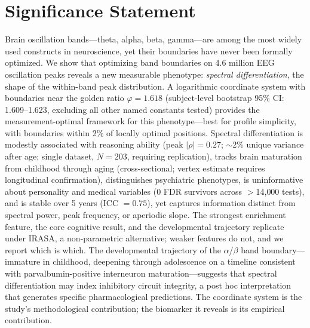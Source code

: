 \documentclass[11pt,a4paper]{article}
\newcommand{\phisym}{\varphi}
\begin{document}
\section*{Significance Statement}
Brain oscillation bands---theta, alpha, beta, gamma---are among the most widely used constructs in neuroscience, yet their boundaries have never been formally optimized. We show that optimizing band boundaries on 4.6 million EEG oscillation peaks reveals a new measurable phenotype: \emph{spectral differentiation}, the shape of the within-band peak distribution. A logarithmic coordinate system with boundaries near the golden ratio $\phisym = 1.618$ (subject-level bootstrap 95\% CI: 1.609--1.623, excluding all other named constants tested) provides the measurement-optimal framework for this phenotype---best for profile simplicity, with boundaries within 2\% of locally optimal positions. Spectral differentiation is modestly associated with reasoning ability (peak $|\rho| = 0.27$; $\sim$2\% unique variance after age; single dataset, $N = 203$, requiring replication), tracks brain maturation from childhood through aging (cross-sectional; vertex estimate requires longitudinal confirmation), distinguishes psychiatric phenotypes, is uninformative about personality and medical variables (0 FDR survivors across $>$14{,}000 tests), and is stable over 5 years (ICC $= 0.75$), yet captures information distinct from spectral power, peak frequency, or aperiodic slope. The strongest enrichment feature, the core cognitive result, and the developmental trajectory replicate under IRASA, a non-parametric alternative; weaker features do not, and we report which is which. The developmental trajectory of the $\alpha$/$\beta$ band boundary---immature in childhood, deepening through adolescence on a timeline consistent with parvalbumin-positive interneuron maturation---suggests that spectral differentiation may index inhibitory circuit integrity, a post hoc interpretation that generates specific pharmacological predictions. The coordinate system is the study's methodological contribution; the biomarker it reveals is its empirical contribution.

\newpage
\tableofcontents
\newpage



\end{document}

